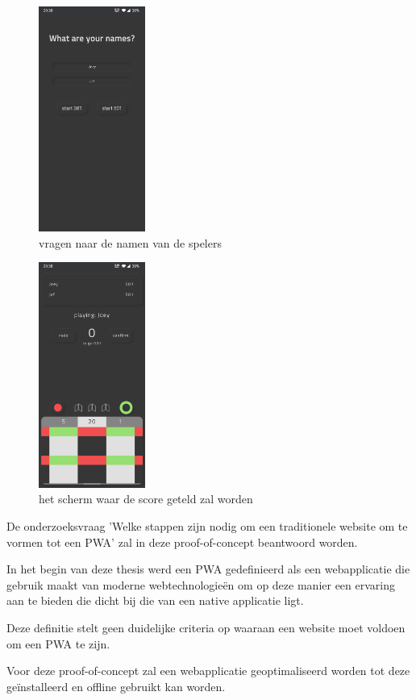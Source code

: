 	\begin{figure}[H]
		\centering
		\includegraphics[width=35mm]{./img/dart3.jpg}{}
		\caption{vragen naar de namen van de spelers}
	\end{figure}
	
	\begin{figure}[H]
		\centering
		\includegraphics[width=35mm]{./img/dart4.jpg}{}
		\caption{het scherm waar de score geteld zal worden}
	\end{figure}
	
	De onderzoeksvraag 'Welke stappen zijn nodig om een traditionele website om te vormen tot een PWA' zal in deze proof-of-concept beantwoord worden.
	
	In het begin van deze thesis werd een PWA gedefinieerd als een webapplicatie die gebruik maakt van moderne webtechnologieën om op deze manier een ervaring aan te bieden die dicht bij die van een native applicatie ligt.
	
	Deze definitie stelt geen duidelijke criteria op waaraan een website moet voldoen om een PWA te zijn.
	
	Voor deze proof-of-concept zal een webapplicatie geoptimaliseerd worden tot deze geïnstalleerd en offline gebruikt kan worden.
	
